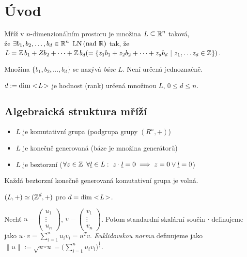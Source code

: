 \section{Úvod}

\begin{definition}[Mříž]
Mříž v $n$-dimenzionálním prostoru je množina $L\subseteq\operatorname{\mathbb{R}}^n$ taková, \\ že $\exists b_1,b_2,\ldots,b_d \in \Real^n \ \LN \text{(nad $\Real$)}$ tak, že  $L=\operatorname{\mathbb{Z}} b_1+Z b_2+\cdots+\operatorname{\mathbb{Z}} b_d \\ (=\{z_1 b_1 + z_2 b_2 + \cdots + z_d b_d \ | \ z_1,\ldots z_d \in \operatorname{\mathbb{Z}}\} )$.
\end{definition}

\begin{note}
Množina $\{b_1,b_2,\ldots,b_d \}$ se nazývá \emph{báze $L$}. Není určená jednoznačně. 

$d:=\operatorname{dim}<\!L\!>$ je hodnost (rank) určená množinou $L$, $0\leq d\leq n$.
\end{note}

\subsection{\texorpdfstring{Algebraická struktura mříží}{Algebraická struktura mrizi}}
\begin{itemize}
    \item $L$ je komutativní grupa (podgrupa grupy $(R^n,+)$)
    \item $L$ je konečně generovaná (báze je množina generátorů)
    \item $L$ je beztorzní ($\forall z\in \operatorname{\mathbb{Z}}\ \forall \underline{l} \in L: \ z\cdot \underline{l}=0\implies z=0\vee \underline{l}=0$)
\end{itemize} 

\begin{theorem}
Každá beztorzní konečně generovaná komutativní grupa je volná.
\end{theorem}

\begin{consequence}
$(L,+)\simeq (\operatorname{\mathbb{Z}}^d,+)$ pro $d = \operatorname{dim}<\!L\!>$.
\end{consequence}

\begin{definition}
Nechť $u=\begin{pmatrix}
u_1 \\
\vdots \\
u_n
\end{pmatrix}$,
$v=\begin{pmatrix}
v_1 \\
\vdots \\
v_n
\end{pmatrix}$. Potom standardní skalární součin $\cdot$ definujeme jako $u\cdot v= \sum_{i=1}^n u_iv_i=u^Tv$.
\emph{Euklidovskou normu} definujeme jako $\|u\|:=\sqrt{u\cdot u}=\big( \sum_{i=1}^n u_iv_i \big)^{\frac{1}{2}}$.
\end{definition}

